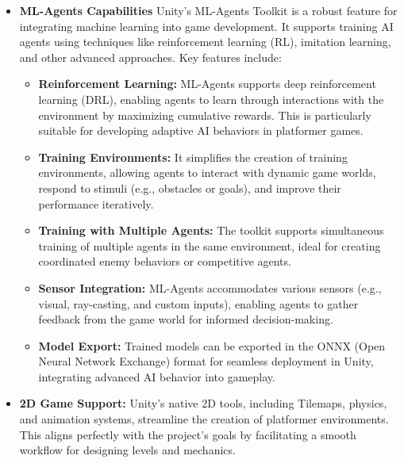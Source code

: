 \documentclass[12pt,oneside,openright,a4paper]{cpe-english-project}
\begin{document}

\begin{itemize}
\item  \textbf{ML-Agents Capabilities}
Unity’s ML-Agents\cite {mlagents_docs} Toolkit is a robust feature for integrating machine learning into game development. It supports training AI agents using techniques like reinforcement learning (RL), imitation learning, and other advanced approaches. Key features include:
\begin{itemize}
\item  \textbf{Reinforcement Learning:} ML-Agents supports deep reinforcement learning (DRL), enabling agents to learn through interactions with the environment by maximizing cumulative rewards. This is particularly suitable for developing adaptive AI behaviors in platformer games.
\item  \textbf{Training Environments:} It simplifies the creation of training environments, allowing agents to interact with dynamic game worlds, respond to stimuli (e.g., obstacles or goals), and improve their performance iteratively.
\item  \textbf{Training with Multiple Agents:} The toolkit supports simultaneous training of multiple agents in the same environment, ideal for creating coordinated enemy behaviors or competitive agents.
\item  \textbf{Sensor Integration:} ML-Agents accommodates various sensors (e.g., visual, ray-casting, and custom inputs), enabling agents to gather feedback from the game world for informed decision-making.
\item  \textbf{Model Export:} Trained models can be exported in the ONNX (Open Neural Network Exchange) format for seamless deployment in Unity, integrating advanced AI behavior into gameplay.
\end{itemize}
\item  \textbf{2D Game Support:}
Unity's native 2D tools, including Tilemaps, physics, and animation systems, streamline the creation of platformer environments. This aligns perfectly with the project's goals by facilitating a smooth workflow for designing levels and mechanics.
\end{itemize}
\end{document}

